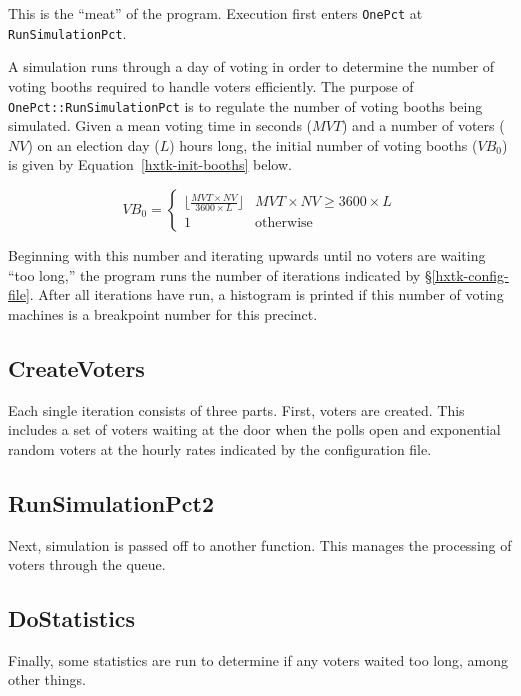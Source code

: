 This is the ``meat'' of the program. Execution first enters \texttt{OnePct} at \texttt{RunSimulationPct}.

A simulation runs through a day of voting in order to determine the number of voting booths required to handle voters efficiently. The purpose of \texttt{OnePct::RunSimulationPct} is to regulate the number of voting booths being simulated. Given a mean voting time in seconds ($MVT$) and a number of voters ($NV$) on an election day ($L$) hours long, the initial number of voting booths ($VB_0$) is given by Equation~\ref{hxtk-init-booths} below.

\begin{equation} \label{hxtk-init-booths}
VB_0 = \begin{cases}
  \lfloor \frac{MVT \times NV}{3600\times L} \rfloor & MVT \times NV \ge 3600\times L \\
  1 & \text{otherwise}
\end{cases}
\end{equation}

Beginning with this number and iterating upwards until no voters are waiting ``too long,'' the program runs the number of iterations indicated by \S\ref{hxtk-config-file}. After all iterations have run, a histogram is printed if this number of voting machines is a breakpoint number for this precinct.

\subsection{CreateVoters}

Each single iteration consists of three parts. First, voters are created. This includes a set of voters waiting at the door when the polls open and exponential random voters at the hourly rates indicated by the configuration file.

\subsection{RunSimulationPct2}

Next, simulation is passed off to another function. This manages the processing of voters through the queue.

\subsection{DoStatistics}

Finally, some statistics are run to determine if any voters waited too long, among other things.

